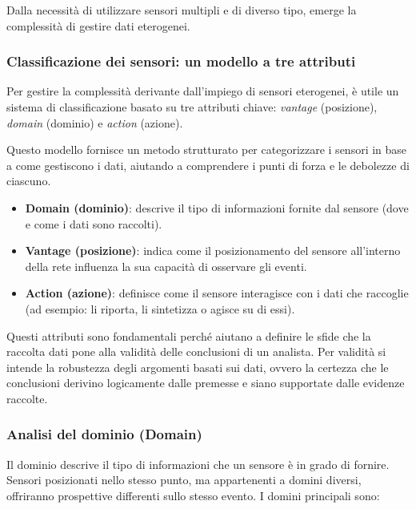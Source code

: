 Dalla necessità di utilizzare sensori multipli e di diverso tipo,
emerge la complessità di gestire dati eterogenei.

\subsubsection{Classificazione dei sensori: un modello a tre attributi}

Per gestire la complessità derivante dall'impiego di sensori eterogenei,
è utile un sistema di classificazione basato su tre attributi chiave:
\textit{vantage} (posizione), \textit{domain} (dominio) e \textit{action} (azione).

Questo modello fornisce un metodo strutturato per categorizzare i sensori
in base a come gestiscono i dati, aiutando a comprendere i punti di forza
e le debolezze di ciascuno.

\begin{itemize}
\item \textbf{Domain (dominio)}: descrive il tipo di informazioni fornite
dal sensore (dove e come i dati sono raccolti).
\item \textbf{Vantage (posizione)}: indica come il posizionamento del sensore
all'interno della rete influenza la sua capacità di osservare gli eventi.
\item \textbf{Action (azione)}: definisce come il sensore interagisce con
i dati che raccoglie (ad esempio: li riporta, li sintetizza o agisce su di essi).
\end{itemize}

Questi attributi sono fondamentali perché aiutano a definire le sfide
che la raccolta dati pone alla validità delle conclusioni di un analista.
Per validità si intende la robustezza degli argomenti basati sui dati,
ovvero la certezza che le conclusioni derivino logicamente dalle premesse
e siano supportate dalle evidenze raccolte.

\subsubsection{Analisi del dominio (Domain)}

Il dominio descrive il tipo di informazioni che un sensore è in grado
di fornire. Sensori posizionati nello stesso punto, ma appartenenti
a domini diversi, offriranno prospettive differenti sullo stesso evento.
I domini principali sono:

